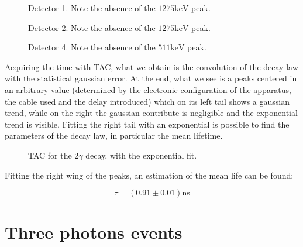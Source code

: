 \documentclass[11pt,a4 paper]{article}
\begin{document}
\begin{figure}[H]
    \centering
    \caption{Detector 1. Note the absence of the $1275\si{\kilo\electronvolt}$ peak.}
    \label{fig:det1:2gamma}
\end{figure}

\begin{figure}[H]
    \centering
    \caption{Detector 2. Note the absence of the $1275\si{\kilo\electronvolt}$ peak.}
    \label{fig:det2:2gamma}
\end{figure}

\begin{figure}[H]
    \centering
    \caption{Detector 4. Note the absence of the $511\si{\kilo\electronvolt}$ peak.}
    \label{fig:det4:2gamma}
\end{figure}

Acquiring the time with TAC, what we obtain is the convolution of the decay law with the statistical gaussian error. At the end, what we see is a peaks centered in an arbitrary value (determined by the electronic configuration of the apparatus, the cable used and the delay introduced) which on its left tail shows a gaussian trend, while on the right the gaussian contribute is negligible and the exponential trend is visible. Fitting the right tail with an exponential is possible to find the parameters of the decay law, in particular the mean lifetime.

\begin{figure}[H]
    \centering
    \caption{TAC for the 2$\gamma$ decay, with the exponential fit.}
    \label{fig:tac:2gamma}
\end{figure}

Fitting the right wing of the peaks, an estimation of the mean life can be found:

\begin{equation}
    \tau = ( 0.91 \pm 0.01) \si{\nano\second}
\end{equation}




\section{Three photons events}
\end{document}
